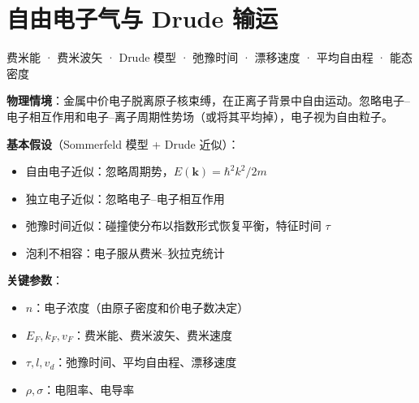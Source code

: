
\section{自由电子气与 Drude 输运}
\label{sec:free-electron-gas}

\begin{tipbox}[关键词标签]
费米能 · 费米波矢 · Drude 模型 · 弛豫时间 · 漂移速度 · 平均自由程 · 能态密度
\end{tipbox}

\begin{modelbox}[模型：自由电子气]
\textbf{物理情境}：金属中价电子脱离原子核束缚，在正离子背景中自由运动。忽略电子--电子相互作用和电子--离子周期性势场（或将其平均掉），电子视为自由粒子。

\textbf{基本假设}（Sommerfeld 模型 + Drude 近似）：
\begin{itemize}[nosep]
    \item 自由电子近似：忽略周期势，$E(\mathbf{k})=\hbar^2k^2/2m$
    \item 独立电子近似：忽略电子--电子相互作用
    \item 弛豫时间近似：碰撞使分布以指数形式恢复平衡，特征时间 $\tau$
    \item 泡利不相容：电子服从费米--狄拉克统计
\end{itemize}

\textbf{关键参数}：
\begin{itemize}[nosep]
    \item $n$：电子浓度（由原子密度和价电子数决定）
    \item $E_F, k_F, v_F$：费米能、费米波矢、费米速度
    \item $\tau, l, v_d$：弛豫时间、平均自由程、漂移速度
    \item $\rho, \sigma$：电阻率、电导率
\end{itemize}
\end{modelbox}

